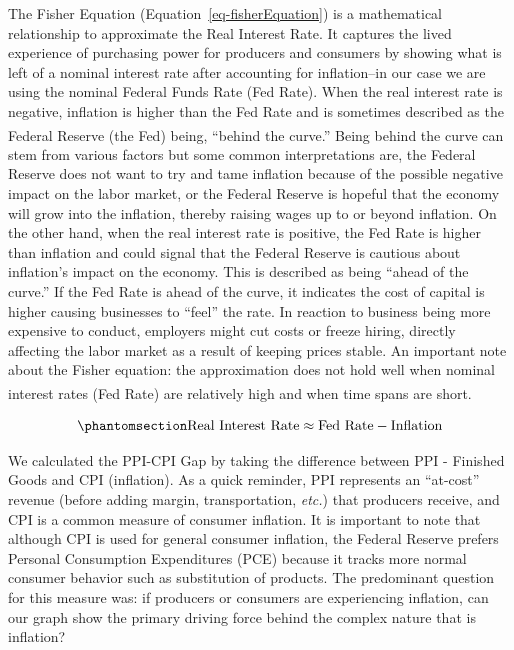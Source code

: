 \documentclass[
  10pt,
  letterpaper,
  DIV=11,
  numbers=noendperiod]{scrartcl}
\begin{document}
The Fisher Equation (Equation~\ref{eq-fisherEquation}) is a mathematical
relationship to approximate the Real Interest Rate. It captures the
lived experience of purchasing power for producers and consumers by
showing what is left of a nominal interest rate after accounting for
inflation--in our case we are using the nominal Federal Funds Rate (Fed
Rate). When the real interest rate is negative, inflation is higher than
the Fed Rate and is sometimes described as the Federal Reserve (the Fed)
being, ``behind the
curve.''\textsuperscript{}
Being behind the curve can stem from various factors but some common
interpretations are, the Federal Reserve does not want to try and tame
inflation because of the possible negative impact on the labor market,
or the Federal Reserve is hopeful that the economy will grow into the
inflation, thereby raising wages up to or beyond inflation. On the other
hand, when the real interest rate is positive, the Fed Rate is higher
than inflation and could signal that the Federal Reserve is cautious
about inflation's impact on the economy. This is described as being
``ahead of the curve.'' If the Fed Rate is ahead of the curve, it
indicates the cost of capital is higher causing businesses to ``feel''
the rate. In reaction to business being more expensive to conduct,
employers might cut costs or freeze hiring, directly affecting the labor
market as a result of keeping prices stable. An important note about the
Fisher equation: the approximation does not hold well when nominal
interest rates (Fed Rate) are relatively high and when time spans are
short.\textsuperscript{}

\begin{equation}\phantomsection\label{eq-fisherEquation}{
\text{Real Interest Rate} \approx \text{Fed Rate} - \text{Inflation}
}\end{equation}

We calculated the PPI-CPI Gap by taking the difference between PPI -
Finished Goods and CPI (inflation). As a quick reminder, PPI represents
an ``at-cost'' revenue (before adding margin, transportation,
\emph{etc.}) that producers receive, and CPI is a common measure of
consumer inflation. It is important to note that although CPI is used
for general consumer inflation, the Federal Reserve prefers Personal
Consumption Expenditures (PCE) because it tracks more normal consumer
behavior such as substitution of products. The predominant question for
this measure was: if producers or consumers are experiencing inflation,
can our graph show the primary driving force behind the complex nature
that is inflation?
\end{document}

